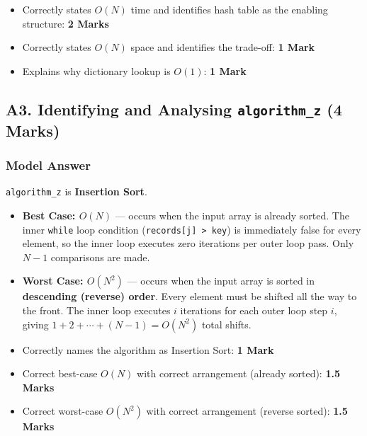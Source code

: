 \documentclass[11pt,a4paper]{article}
\newenvironment{markbox}[1]{%
    \begin{tcolorbox}[colback=markgreen!6!white, colframe=markgreen, title=\textbf{Mark Allocation --- #1}]
}{%
    \end{tcolorbox}
}
\begin{document}
\begin{markbox}{A2 --- 4 Marks}
\begin{itemize}
    \item Correctly states $O(N)$ time and identifies hash table as the enabling structure: \textbf{2 Marks}
    \item Correctly states $O(N)$ space and identifies the trade-off: \textbf{1 Mark}
    \item Explains why dictionary lookup is $O(1)$: \textbf{1 Mark}
\end{itemize}
\end{markbox}

\newpage

\subsection*{A3. Identifying and Analysing \texttt{algorithm\_z} (4 Marks)}

\subsubsection*{Model Answer}
\texttt{algorithm\_z} is \textbf{Insertion Sort}.

\begin{itemize}
    \item \textbf{Best Case: $O(N)$} --- occurs when the input array is already sorted. The inner \texttt{while} loop condition (\texttt{records[j] > key}) is immediately false for every element, so the inner loop executes zero iterations per outer loop pass. Only $N-1$ comparisons are made.
    \item \textbf{Worst Case: $O(N^2)$} --- occurs when the input array is sorted in \textbf{descending (reverse) order}. Every element must be shifted all the way to the front. The inner loop executes $i$ iterations for each outer loop step $i$, giving $1 + 2 + \cdots + (N-1) = O(N^2)$ total shifts.
\end{itemize}

\begin{markbox}{A3 --- 4 Marks}
\begin{itemize}
    \item Correctly names the algorithm as Insertion Sort: \textbf{1 Mark}
    \item Correct best-case $O(N)$ with correct arrangement (already sorted): \textbf{1.5 Marks}
    \item Correct worst-case $O(N^2)$ with correct arrangement (reverse sorted): \textbf{1.5 Marks}
\end{itemize}
\end{markbox}
\end{document}
